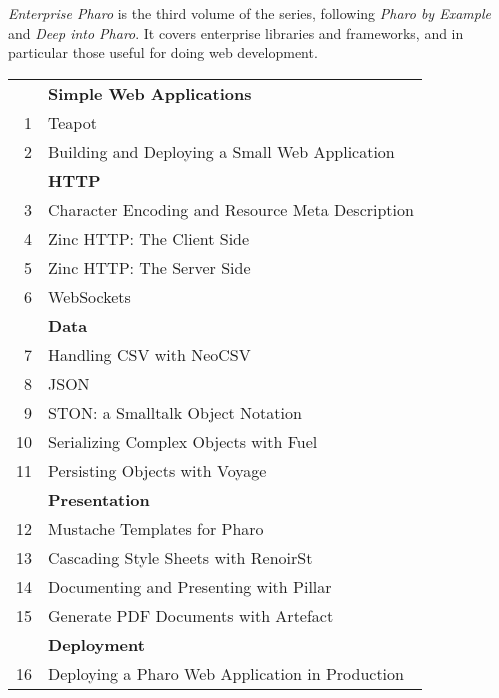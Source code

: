 \documentclass[11pt,english]{../support/latex/sbabook/sbabook}
\begin{document}
\sffamily
\pagestyle{titlingpage}
\thispagestyle{titlingpage} %

\emph{Enterprise Pharo} is the third volume of the series, following
\emph{Pharo by Example} and \emph{Deep into Pharo}. It covers
enterprise libraries and frameworks, and in particular those useful
for doing web development.

\begin{tabular}{@{\quad}r@{\quad}l@{}}
   & \textbf{Simple Web Applications}                 \\
1  & Teapot                                           \\
2  & Building and Deploying a Small Web Application   \\[\smallskipamount]
   & \textbf{HTTP}                                    \\
3  & Character Encoding and Resource Meta Description \\
4  & Zinc HTTP: The Client Side                       \\
5  & Zinc HTTP: The Server Side                       \\
6  & WebSockets                                       \\[\smallskipamount]
   & \textbf{Data}                                    \\
7  & Handling CSV with NeoCSV                         \\
8  & JSON                                             \\
9  & STON: a Smalltalk Object Notation                \\
10 & Serializing Complex Objects with Fuel            \\
11 & Persisting Objects with Voyage                   \\[\smallskipamount]
   & \textbf{Presentation}                            \\
12 & Mustache Templates for Pharo                     \\
13 & Cascading Style Sheets with RenoirSt             \\
14 & Documenting and Presenting with Pillar           \\
15 & Generate PDF Documents with Artefact             \\[\smallskipamount]
   & \textbf{Deployment}                              \\
16 & Deploying a Pharo Web Application in Production  \\

\end{tabular}
\end{document}
